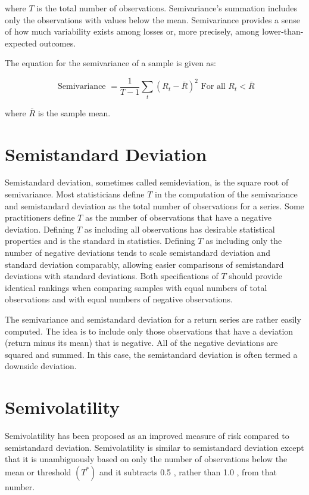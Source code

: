 \documentclass[11pt]{article}
\begin{document}
where $T$ is the total number of observations. Semivariance's summation includes only the observations with values below the mean. Semivariance provides a sense of how much variability exists among losses or, more precisely, among lower-than-expected outcomes.

The equation for the semivariance of a sample is given as:


\begin{equation*}
\text { Semivariance }=\frac{1}{T-1} \sum_{t}\left(R_{t}-\bar{R}\right)^{2} \text { For all } R_{t}<\bar{R} \tag{2}
\end{equation*}


where $\bar{R}$ is the sample mean.

\section*{Semistandard Deviation}
Semistandard deviation, sometimes called semideviation, is the square root of semivariance. Most statisticians define $T$ in the computation of the semivariance and semistandard deviation as the total number of observations for a series. Some practitioners define $T$ as the number of observations that have a negative deviation. Defining $T$ as including all observations has desirable statistical properties and is the standard in statistics. Defining $T$ as including only the number of negative deviations tends to scale semistandard deviation and standard deviation comparably, allowing easier comparisons of semistandard deviations with standard deviations. Both specifications of $T$ should provide identical rankings when comparing samples with equal numbers of total observations and with equal numbers of negative observations.

The semivariance and semistandard deviation for a return series are rather easily computed. The idea is to include only those observations that have a deviation (return minus its mean) that is negative. All of the negative deviations are squared and summed. In this case, the semistandard deviation is often termed a downside deviation.

\section*{Semivolatility}
Semivolatility has been proposed as an improved measure of risk compared to semistandard deviation. Semivolatility is similar to semistandard deviation except that it is unambiguously based on only the number of observations below the mean or threshold $\left(T^{*}\right)$ and it subtracts 0.5 , rather than 1.0 , from that number.
\end{document}
